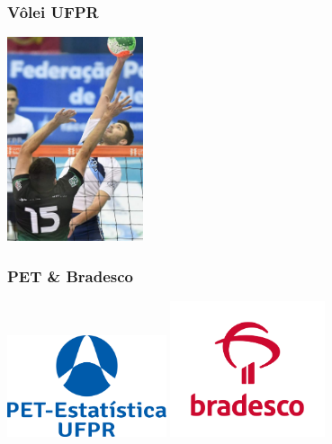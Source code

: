 \documentclass[10pt,
  aspectratio=169,
  serif,
  mathserif,
  professionalfont,
  compress,
  handout,
  ]{beamer}\usepackage[]{graphicx}\usepackage[]{color}
\begin{document}

\begin{frame}

\frametitle{Vôlei UFPR}

\begin{center}
  \includegraphics[height=6cm]{img/volei1.jpg}
\end{center}

\end{frame}



\begin{frame}

\frametitle{PET \& Bradesco}

\begin{center}
  \includegraphics[height=3cm]{img/pet.png}\hspace{2em}
  \includegraphics[height=4cm]{img/bradesco2.png}
\end{center}

\end{frame}

\end{document}
